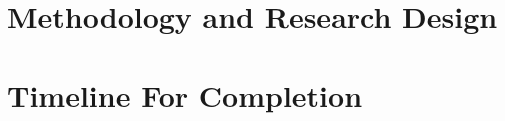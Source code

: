 \documentclass[a4paper,10pt,twoside]{report}
\def\chaptersep{}
\begin{document}
\chaptersep

\chapter{Methodology and Research Design}\label{chapter:second_real_chapter}


\chaptersep

\chapter{Timeline For Completion}\label{chapter:conclusions}


\chaptersep

%



\chaptersep

\appendix
{}


\end{document}
